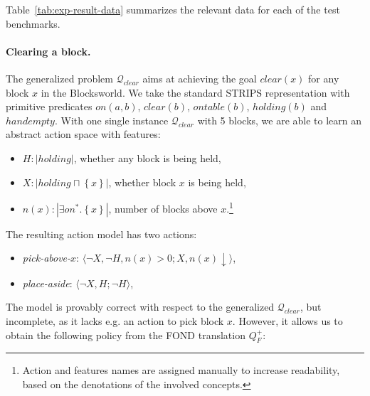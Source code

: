 \documentclass[letterpaper]{article} %
\newcommand{\tuple}[1]{\ensuremath{\langle #1 \rangle}}
\newcommand{\set}[1]{\ensuremath{\left\{#1 \right\}}}
\newcommand{\abs}[1]{\ensuremath{\left\vert{#1}\right\vert}}
\newcommand{\Q}{\mathcal{Q}}
\begin{document}
Table~\ref{tab:exp-result-data} summarizes the relevant data for each of the test benchmarks.


\paragraph{Clearing a block.}
The generalized problem $\Q_{clear}$ aims at achieving the goal $clear(x)$ for any block $x$
in the Blocksworld.
We take the standard STRIPS representation with primitive predicates $on(a, b)$, $clear(b)$, $ontable(b)$, $holding(b)$ and $handempty$.
%
With one single instance $\Q_{clear}$ with 5 blocks, we are able to learn
an abstract action space with features:

\begin{itemize}
\item $H: \abs{holding}$, whether any block is being held,
\item $X: \abs{holding \sqcap \set{x}}$, whether block $x$ is being held,
\item $n(x): \abs{\exists on^* . \set{x}}$, number of blocks above $x$.\footnote{
Action and features names are assigned manually to increase readability, based on the denotations of the involved concepts.
}
\end{itemize}

\noindent The resulting action model has two actions:

\begin{itemize}
\item \emph{pick-above-$x$}: \hspace*{\fill} \tuple{\neg X, \neg H, n(x) > 0; X, n(x) \downarrow},
\item \emph{place-aside}: \hspace*{\fill} \tuple{\neg X, H; \neg H},
\end{itemize}


\noindent 
The model is provably correct with respect to the generalized $\Q_{clear}$, but incomplete, as it lacks e.g.
an action to pick block $x$. However, it allows us to obtain the following policy from the FOND translation $Q^+_F$:
\end{document}
